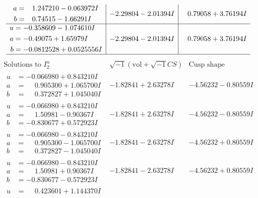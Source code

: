 \documentclass[1p]{elsarticle_modified}
\theoremstyle{definition}
\newcommand{\I}{\sqrt{-1}}
\begin{document}
$$\begin{array}{c|c|c}
\begin{aligned}
a &= \phantom{-}1.247210 - 0.063972 I \\
b &= \phantom{-}0.74515 - 1.66291 I\end{aligned}
 & -2.29804 - 2.01394 I & \phantom{-}0.79058 + 3.76194 I \\ \hline\begin{aligned}
u &= -0.358609 - 1.074610 I \\
a &= -0.49075 + 1.65979 I \\
b &= -0.0812528 + 0.0525556 I\end{aligned}
 & -2.29804 - 2.01394 I & \phantom{-}0.79058 + 3.76194 I\\
 \hline 
 \end{array}$$\newpage$$\begin{array}{c|c|c}  
\text{Solutions to }I^u_{2}& \I (\text{vol} + \sqrt{-1}CS) & \text{Cusp shape}\\
 \hline 
\begin{aligned}
u &= -0.066980 + 0.843210 I \\
a &= \phantom{-}0.905300 + 1.065700 I \\
b &= \phantom{-}0.372827 + 1.045040 I\end{aligned}
 & -1.82841 + 2.63278 I & -4.56232 - 0.80559 I \\ \hline\begin{aligned}
u &= -0.066980 + 0.843210 I \\
a &= \phantom{-}1.50981 - 0.90367 I \\
b &= -0.830677 + 0.572923 I\end{aligned}
 & -1.82841 + 2.63278 I & -4.56232 - 0.80559 I \\ \hline\begin{aligned}
u &= -0.066980 - 0.843210 I \\
a &= \phantom{-}0.905300 - 1.065700 I \\
b &= \phantom{-}0.372827 - 1.045040 I\end{aligned}
 & -1.82841 - 2.63278 I & -4.56232 + 0.80559 I \\ \hline\begin{aligned}
u &= -0.066980 - 0.843210 I \\
a &= \phantom{-}1.50981 + 0.90367 I \\
b &= -0.830677 - 0.572923 I\end{aligned}
 & -1.82841 - 2.63278 I & -4.56232 + 0.80559 I \\ \hline\begin{aligned}
u &= \phantom{-}0.423601 + 1.144370 I \\

\end{aligned}
\end{array}$$
\end{document}
